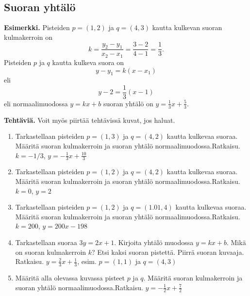 \documentclass[10pt]{article}
\newcommand{\ratkaisu}[1]{\hfill{\color{blue}\quad\textrm{Ratkaisu. } #1}}
\begin{document}
\subsection{Suoran yhtälö}

\textbf{Esimerkki.} Pisteiden $p=(1,2)$ ja $q=(4,3)$ kautta kulkevan suoran kulmakerroin on
$$
k=\frac{y_2-y_1}{x_2-x_1}=\frac{3-2}{4-1}=\frac{1}{3}.
$$
Pisteiden $p$ ja $q$ kautta kulkeva suora on
$$
y-y_1=k(x-x_1)
$$
eli
$$
y-2=\frac{1}{3}(x-1)
$$
eli normaalimuodossa $y=kx+b$ suoran yhtälö on $y=\frac13 x+\frac53$.

\def\px{1}
\def\py{2}
\def\qx{4}
\def\qy{3}

\newpage

\textbf{Tehtäviä.} Voit myös piirtää tehtävissä kuvat, jos haluat.

\begin{enumerate}
\item Tarkastellaan pisteiden $p=(1,3)$ ja $q=(4,2)$ kautta kulkevaa suoraa. 
Määritä suoran kulmakerroin ja suoran yhtälö normaalimuodossa.\ratkaisu{$k=-1/3$, $y=-\frac13 x+\frac{10}{3}$}
\item Tarkastellaan pisteiden $p=(1,2)$ ja $q=(4,2)$ kautta kulkevaa suoraa. 
Määritä suoran kulmakerroin ja suoran yhtälö normaalimuodossa.\ratkaisu{$k=0$, $y=2$}
\item Tarkastellaan pisteiden $p=(1,2)$ ja $q=(1.01,4)$ kautta kulkevaa suoraa. 
Määritä suoran kulmakerroin ja suoran yhtälö normaalimuodossa.\ratkaisu{$k=200$, $y=200x-198$}
\item Tarkastellaan suoraa $3y=2x+1$. Kirjoita yhtälö muodossa $y=kx+b$. Mikä on suoran kulmakerroin $k$? Etsi kaksi suoran pistettä. Piirrä suoran kuvaaja.
\ratkaisu{$y=\frac23 x+\frac13$, esim. $p=(1,1)$ ja $q=(4,3)$}
\item Määritä alla olevassa kuvassa pisteet $p$ ja $q$. Määritä suoran kulmakerroin ja suoran yhtälö normaalimuodossa.\ratkaisu{$y=-\frac12 x+\frac72$}
\end{enumerate}
\end{document}
